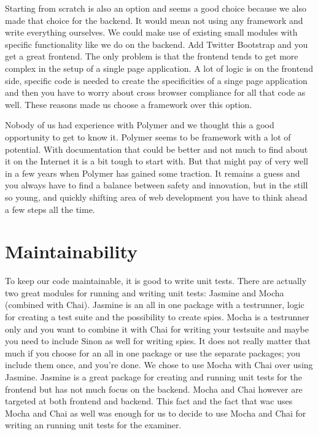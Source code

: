 Starting from scratch is also an option
and seems a good choice because we also made that choice for the backend.
It would mean not using any framework and write everything ourselves.
We could make use of existing small modules with specific functionality
like we do on the backend.
Add Twitter Bootstrap and you get a great frontend.
The only problem is that the frontend tends to get more complex
in the setup of a single page application.
A lot of logic is on the frontend side,
specific code is needed to create the specificities of a singe page application
and then you have to worry about cross browser compliance
for all that code as well.
These reasons made us choose a framework over this option.

Nobody of us had experience with Polymer
and we thought this a good opportunity to get to know it.
Polymer seems to be framework with a lot of potential.
With documentation that could be better
and not much to find about it on the Internet
it is a bit tough to start with.
But that might pay of very well in a few years
when Polymer has gained some traction.
It remains a guess and you always have to find a balance
between safety and innovation,
but in the still so young, and quickly shifting area of web development
you have to think ahead a few steps all the time.

\section{Maintainability}
To keep our code maintainable, it is good to write unit tests.
There are actually two great modules for running and writing unit tests:
Jasmine and Mocha (combined with Chai).
Jasmine is an all in one package with a testrunner,
logic for creating a test suite and the possibility to create spies.
Mocha is a testrunner only
and you want to combine it with Chai for writing your testsuite
and maybe you need to include Sinon as well for writing spies.
It does not really matter that much if you choose for an all in one package
or use the separate packages; you include them once, and you're done.
We chose to use Mocha with Chai over using Jasmine.
Jasmine is a great package for creating and running unit tests for the frontend
but has not much focus on the backend.
Mocha and Chai however are targeted at both frontend and backend.
This fact and the fact that \gls{wac} uses Mocha and Chai as well
was enough for us to decide to use Mocha and Chai
for writing an running unit tests for the \gls{examiner}.
